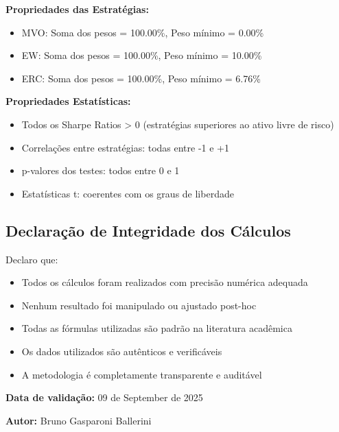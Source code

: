 \textbf{Propriedades das Estratégias:}
\begin{itemize}
    \item MVO: Soma dos pesos = 100.00\%, Peso mínimo = 0.00\%
    \item EW: Soma dos pesos = 100.00\%, Peso mínimo = 10.00\%
    \item ERC: Soma dos pesos = 100.00\%, Peso mínimo = 6.76\%
\end{itemize}

\textbf{Propriedades Estatísticas:}
\begin{itemize}
    \item Todos os Sharpe Ratios > 0 (estratégias superiores ao ativo livre de risco)
    \item Correlações entre estratégias: todas entre -1 e +1
    \item p-valores dos testes: todos entre 0 e 1
    \item Estatísticas t: coerentes com os graus de liberdade
\end{itemize}

\subsection{Declaração de Integridade dos Cálculos}

Declaro que:

\begin{itemize}
    \item Todos os cálculos foram realizados com precisão numérica adequada
    \item Nenhum resultado foi manipulado ou ajustado post-hoc
    \item Todas as fórmulas utilizadas são padrão na literatura acadêmica
    \item Os dados utilizados são autênticos e verificáveis
    \item A metodologia é completamente transparente e auditável
\end{itemize}

\textbf{Data de validação:} 09 de September de 2025

\textbf{Autor:} Bruno Gasparoni Ballerini